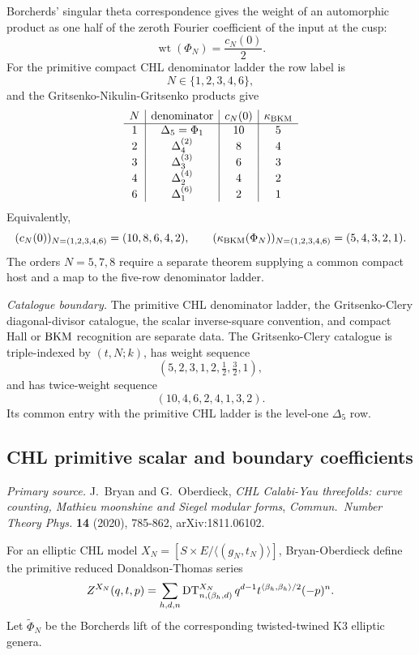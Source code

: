 Borcherds' singular theta correspondence gives the weight of an
automorphic product as one half of the zeroth Fourier coefficient of
the input at the cusp:
\[
  \operatorname{wt}(\Phi_N)=\frac{c_N(0)}{2}.
\]
For the primitive compact CHL denominator ladder the row label is
\[
  N\in\{1,2,3,4,6\},
\]
and the Gritsenko-Nikulin-Gritsenko products give
\[
\begin{array}{c|c|c|c}
N & \text{denominator} & c_N(0) & \kappa_{\mathrm{BKM}} \\ \hline
1 & \Delta_5=\Phi_1 & 10 & 5\\
2 & \Delta_4^{(2)} & 8 & 4\\
3 & \Delta_3^{(3)} & 6 & 3\\
4 & \Delta_2^{(4)} & 4 & 2\\
6 & \Delta_1^{(6)} & 2 & 1
\end{array}
\]
Equivalently,
\[
  (c_N(0))_{N=(1,2,3,4,6)}=(10,8,6,4,2),\qquad
  (\kappa_{\mathrm{BKM}}(\Phi_N))_{N=(1,2,3,4,6)}=(5,4,3,2,1).
\]
The orders \(N=5,7,8\) require a separate theorem supplying a common
compact host and a map to the five-row denominator ladder.

\emph{Catalogue boundary.} The primitive CHL denominator ladder, the
Gritsenko-Clery diagonal-divisor catalogue, the scalar inverse-square
convention, and compact Hall or \(\mathrm{BKM}\) recognition are separate data.
The Gritsenko-Clery catalogue is triple-indexed by \((t,N;k)\), has
weight sequence
\[
  (5,2,3,1,2,\tfrac12,\tfrac32,1),
\]
and has twice-weight sequence
\[
  (10,4,6,2,4,1,3,2).
\]
Its common entry with the primitive CHL ladder is the level-one
\(\Delta_5\) row.

\subsection*{CHL primitive scalar and boundary coefficients}

\emph{Primary source.} J.~Bryan and G.~Oberdieck,
\emph{CHL Calabi-Yau threefolds: curve counting, Mathieu moonshine
and Siegel modular forms}, \emph{Commun.\ Number Theory Phys.}
\textbf{14} (2020), 785-862, arXiv:1811.06102.

For an elliptic CHL model \(X_N=[S\times E/\langle(g_N,t_N)\rangle]\),
Bryan-Oberdieck define the primitive reduced Donaldson-Thomas series
\[
  Z^{X_N}(q,t,p)
  =
  \sum_{h,d,n}
  \mathrm{DT}^{X_N}_{n,(\beta_h,d)}\,
  q^{d-1}t^{\langle\beta_h,\beta_h\rangle/2}(-p)^n .
\]
Let \(\widetilde\Phi_N\) be the Borcherds lift of the corresponding
twisted-twined K3 elliptic genera.

